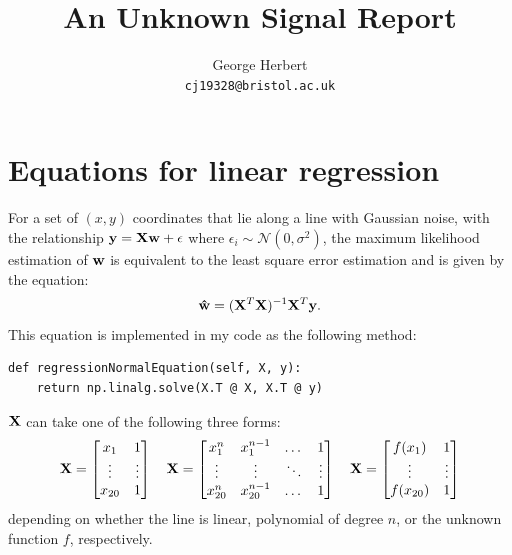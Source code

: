 \documentclass[onecolumn, 12pt, a4paper]{article}
\author{
  George Herbert\\
  \texttt{cj19328@bristol.ac.uk}
}
\title{An Unknown Signal Report}
\begin{document}
\maketitle


\section{Equations for linear regression}

For a set of $(x, y)$ coordinates that lie along a line with Gaussian noise, 
with the relationship $\vb{y} = \vb{X}\vb{w} + \vb{\epsilon}$ where $\epsilon_{i} \sim \mathcal{N}(0, \sigma^{2})$,
the maximum likelihood estimation of $\vb{w}$ is equivalent to
the least square error estimation and is given by the equation:
\[
    \vb{\hat{w}} = (\vb{X}^{T}\vb{X})^{-1}\vb{X}^{T}\vb{y}.
\]
This equation is implemented in my code as the following
method:
\begin{verbatim}
def regressionNormalEquation(self, X, y):
    return np.linalg.solve(X.T @ X, X.T @ y)
\end{verbatim}

$\vb{X}$ can take one of the following
three forms:
\[
\vb{X} =
\begin{bmatrix}
    x_{1} & 1 \\
    \vdots & \vdots \\
    x_{20} & 1 \\
\end{bmatrix}
\quad
\vb{X} =
\begin{bmatrix}
    x_{1}^{n} & x_{1}^{n-1} & \dots & 1 \\
    \vdots & \vdots & \ddots & \vdots \\
    x_{20}^{n} & x_{20}^{n-1} & \dots & 1 \\
\end{bmatrix}
\quad
\vb{X} =
\begin{bmatrix}
    f(x_{1}) & 1 \\
    \vdots & \vdots \\
    f(x_{20}) & 1 \\
\end{bmatrix}
\]
depending on whether the line is linear, polynomial of degree $n$,
or the unknown function $f$, respectively.
\end{document}
